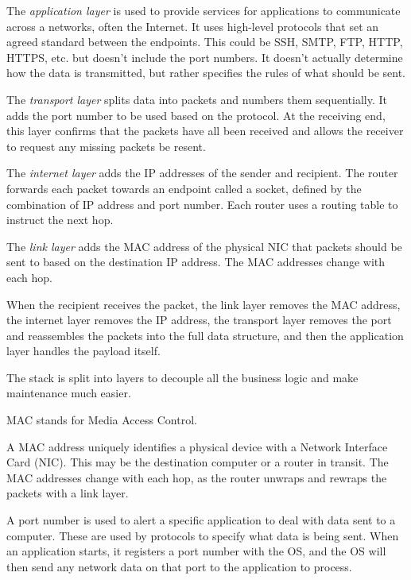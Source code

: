 \documentclass[../main.tex]{subfile}
\begin{document}
The \textit{application layer} is used to provide services for applications to communicate across a networks, often the Internet. It uses high-level protocols that set an agreed standard between the endpoints. This could be SSH, SMTP, FTP, HTTP, HTTPS, etc. but doesn't include the port numbers. It doesn't actually determine how the data is transmitted, but rather specifies the rules of what should be sent.

The \textit{transport layer} splits data into packets and numbers them sequentially. It adds the port number to be used based on the protocol. At the receiving end, this layer confirms that the packets have all been received and allows the receiver to request any missing packets be resent.

The \textit{internet layer} adds the IP addresses of the sender and recipient. The router forwards each packet towards an endpoint called a socket, defined by the combination of IP address and port number. Each router uses a routing table to instruct the next hop.

The \textit{link layer} adds the MAC address of the physical NIC that packets should be sent to based on the destination IP address. The MAC addresses change with each hop.

When the recipient receives the packet, the link layer removes the MAC address, the internet layer removes the IP address, the transport layer removes the port and reassembles the packets into the full data structure, and then the application layer handles the payload itself.

The stack is split into layers to decouple all the business logic and make maintenance much easier.


MAC stands for Media Access Control.

A MAC address uniquely identifies a physical device with a Network Interface Card (NIC). This may be the destination computer or a router in transit. The MAC addresses change with each hop, as the router unwraps and rewraps the packets with a link layer.


A port number is used to alert a specific application to deal with data sent to a computer. These are used by protocols to specify what data is being sent. When an application starts, it registers a port number with the OS, and the OS will then send any network data on that port to the application to process.
\end{document}
